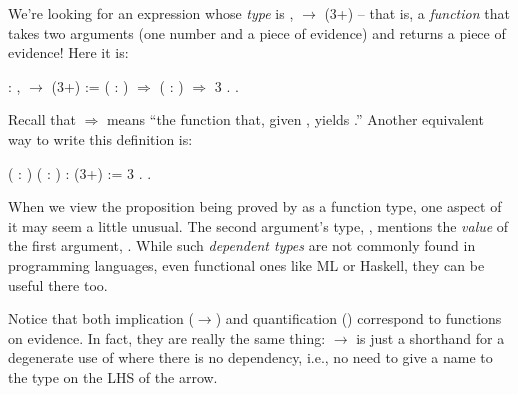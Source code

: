\documentclass[12pt]{report}
\begin{document}
    We're looking for an expression whose \textit{type} is \coqdockw{\ensuremath{\forall}} ,
      \ensuremath{\rightarrow}  (3+) -- that is, a \textit{function} that
    takes two arguments (one number and a piece of evidence) and
    returns a piece of evidence!  Here it is: \begin{coqdoccode}
\coqdocemptyline
\coqdocnoindent
{}  : \coqdockw{\ensuremath{\forall}} ,   \ensuremath{\rightarrow}  (3+) := \coqdoceol
\coqdocindent{1.00em}
 ( : ) \ensuremath{\Rightarrow}  ( :  ) \ensuremath{\Rightarrow}\coqdoceol
\coqdocindent{2.00em}
 3   .\coqdoceol
\coqdocemptyline
\coqdocnoindent
{} .\coqdoceol
\coqdocemptyline
\end{coqdoccode}
Recall that   \ensuremath{\Rightarrow}  means ``the function that, given ,
    yields .''  Another equivalent way to write this definition is: \begin{coqdoccode}
\coqdocemptyline
\coqdocnoindent
{}  ( : ) ( :  ) :  (3+) := \coqdoceol
\coqdocindent{1.00em}
 3   .\coqdoceol
\coqdocemptyline
\coqdocnoindent
{} .\coqdoceol
\coqdocemptyline
\end{coqdoccode}
When we view the proposition being proved by  as a function type,
    one aspect of it may seem a little unusual. The second argument's
    type,  , mentions the \textit{value} of the first argument, .
    While such \textit{dependent types} are not commonly found in programming
    languages, even functional ones like ML or Haskell, they can
    be useful there too.  


    Notice that both implication (\ensuremath{\rightarrow}) and quantification (\coqdockw{\ensuremath{\forall}})
    correspond to functions on evidence.  In fact, they are really the
    same thing: \ensuremath{\rightarrow} is just a shorthand for a degenerate use of
    \coqdockw{\ensuremath{\forall}} where there is no dependency, i.e., no need to give a name
    to the type on the LHS of the arrow. 
\end{document}
